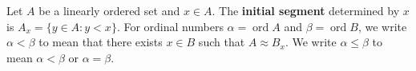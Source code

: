 Let \(A\) be a linearly ordered set and \(x \in A\). The \textbf{initial segment} determined by \(x\) is \(A_x = \{y \in A : y < x\}\). For ordinal numbers \(\alpha = \operatorname{ord} A\) and \(\beta = \operatorname{ord} B\), we write \(\alpha < \beta\) to mean that there exists \(x \in B\) such that \(A \approx B_x\). We write \(\alpha \leq \beta\) to mean \(\alpha < \beta\) or \(\alpha = \beta\).
